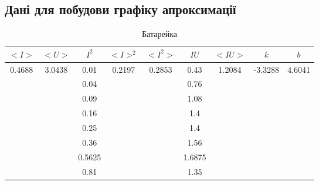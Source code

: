 \documentclass[a4paper,12pt]{article}
\begin{document}
	\begin{center}
		\subsection*{\LARGE{Дані для побудови графіку апроксимації}}
	\end{center}
	\begin{table}[htbp]
		\centering
		\caption{Батарейка}
		\begin{tabular}{|c|c|c|c|c|c|c|c|c|}
			\hline
			\textbf{$<I>$}          & \textbf{$<U>$}          & \textbf{$I^2$} & \textbf{$<I>^2$}        & \textbf{$<I^2>$}        & \textbf{$IU$} & \textbf{$<IU>$}         & \textbf{$k$}             & \textbf{$b$}            \\ \hline
			\multirow{8}{*}{0.4688} & \multirow{8}{*}{3.0438} & 0.01           & \multirow{8}{*}{0.2197} & \multirow{8}{*}{0.2853} & 0.43          & \multirow{8}{*}{1.2084} & \multirow{8}{*}{-3.3288} & \multirow{8}{*}{4.6041} \\ \cline{3-3} \cline{6-6}
			&                         & 0.04           &                         &                         & 0.76          &                         &                          &                         \\ \cline{3-3} \cline{6-6}
			&                         & 0.09           &                         &                         & 1.08          &                         &                          &                         \\ \cline{3-3} \cline{6-6}
			&                         & 0.16           &                         &                         & 1.4           &                         &                          &                         \\ \cline{3-3} \cline{6-6}
			&                         & 0.25           &                         &                         & 1.4           &                         &                          &                         \\ \cline{3-3} \cline{6-6}
			&                         & 0.36           &                         &                         & 1.56          &                         &                          &                         \\ \cline{3-3} \cline{6-6}
			&                         & 0.5625         &                         &                         & 1.6875        &                         &                          &                         \\ \cline{3-3} \cline{6-6}
			&                         & 0.81           &                         &                         & 1.35          &                         &                          &                         \\ \hline
		\end{tabular}
	\end{table}
\end{document}
